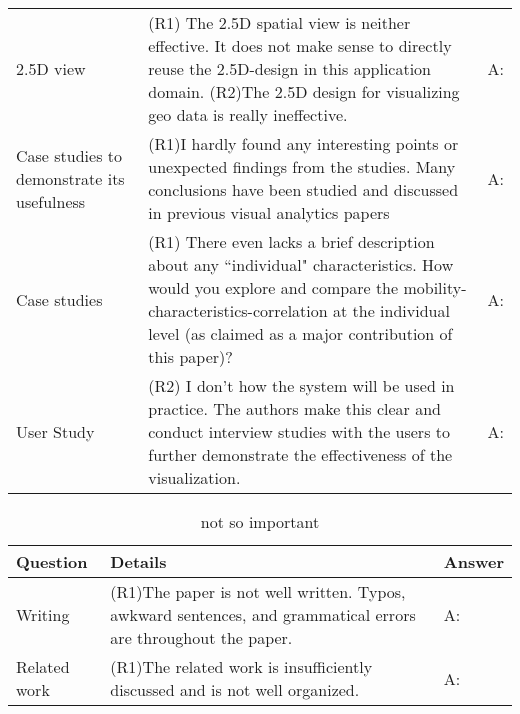 \documentclass[UTF8]{article}
\begin{document}
\begin{table}[h]
\begin{tabular}{|p{4cm}|p{9cm}|p{4cm}|}
    2.5D view & (R1) The 2.5D spatial view is neither effective. It does not make sense to directly reuse the 2.5D-design in this application domain. (R2)The 2.5D design for visualizing geo data is really ineffective.\newline & A:\color{red}{We took reivewer' advices of ineffective 2.5D and changed the spatial view to conventional 2D view.}\\

    Case studies to demonstrate its usefulness & (R1)I hardly found any interesting points or unexpected findings from the studies. Many conclusions have been studied and discussed in previous visual analytics papers  \newline & A:\color{red}{We updated the case studies, including the observations in ..., ....}\\

    Case studies & (R1) There even lacks a brief description about any ``individual" characteristics. How would you explore and compare the mobility- characteristics-correlation at the individual level (as claimed as a major contribution of this paper)?\newline & A:\color{red}{We enriched the exploration in ``individual" movement by... (Section XX).}\\

    User Study & (R2) I don't how the system will be used in practice. The authors make this clear and conduct interview studies with the users to further demonstrate the effectiveness of the visualization. & A:\color{red}{We performed an interview with domain experts in usage, and reported their feedback in Section XXX.}\\
    
    \hline
    \end{tabular}
\end{table}


\begin{table}[h]
\centering
\caption{not so important}
    \begin{tabular}{|p{3cm}|p{9cm}|p{5cm}|}
    \hline
    Question & Details & Answer \\
    \hline
    Writing & (R1)The paper is not well written. Typos, awkward sentences, and grammatical errors are throughout the paper.\newline & A: \\

    Related work & (R1)The related work is insufficiently discussed and is not well organized.\newline & A: \\

    \hline
    \end{tabular}
\end{table}
\end{document}
